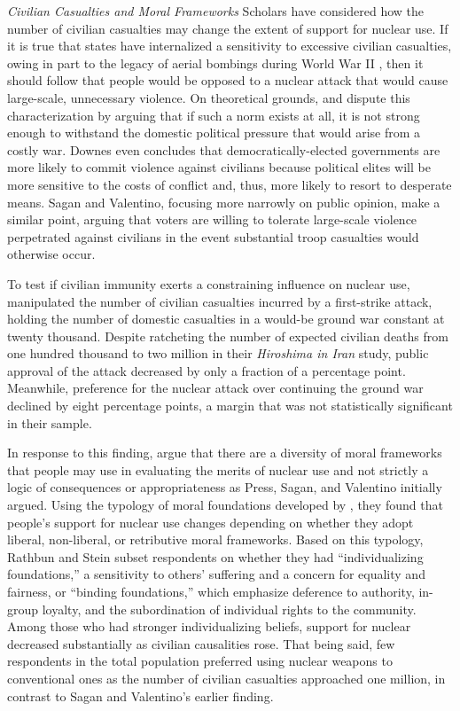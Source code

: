 \documentclass[12pt]{article}
\begin{document}
\textit{Civilian Casualties and Moral Frameworks}
\noindent
Scholars have considered how the number of civilian casualties may change the extent of support for nuclear use. If it is true that states have internalized a sensitivity to excessive civilian casualties, owing in part to the legacy of aerial bombings during World War II \citep{pinker_better_2011, thomas_ethics_2014}, then it should follow that people would be opposed to a nuclear attack that would cause large-scale, unnecessary violence. On theoretical grounds, \citet{downes_desperate_2006} and \citet{sagan_revisiting_2017} dispute this characterization by arguing that if such a norm exists at all, it is not strong enough to withstand the domestic political pressure that would arise from a costly war. Downes even concludes that democratically-elected governments are more likely to commit violence against civilians because political elites will be more sensitive to the costs of conflict and, thus, more likely to resort to desperate means. Sagan and Valentino, focusing more narrowly on public opinion, make a similar point, arguing that voters are willing to tolerate large-scale violence perpetrated against civilians in the event substantial troop casualties would otherwise occur.

To test if civilian immunity exerts a constraining influence on nuclear use, \citet{sagan_revisiting_2017} manipulated the number of civilian casualties incurred by a first-strike attack, holding the number of domestic casualties in a would-be ground war constant at twenty thousand. Despite ratcheting the number of expected civilian deaths from one hundred thousand to two million in their \textit{Hiroshima in Iran} study, public approval of the attack decreased by only a fraction of a percentage point. Meanwhile, preference for the nuclear attack over continuing the ground war declined by eight percentage points, a margin that was not statistically significant in their sample.

In response to this finding, \citet{rathbun_greater_2019} argue that there are a diversity of moral frameworks that people may use in evaluating the merits of nuclear use and not strictly a logic of consequences or appropriateness as Press, Sagan, and Valentino initially argued. Using the typology of moral foundations developed by \citet{graham_mapping_2011}, they found that people's support for nuclear use changes depending on whether they adopt liberal, non-liberal, or retributive moral frameworks. Based on this typology, Rathbun and Stein subset  respondents on whether they had “individualizing foundations,” a sensitivity to others' suffering and a concern for equality and fairness, or “binding foundations,” which emphasize deference to authority, in-group loyalty, and the subordination of individual rights to the community. Among those who had stronger individualizing beliefs, support for nuclear decreased substantially as civilian causalities rose. That being said, few respondents in the total population preferred using nuclear weapons to conventional ones as the number of civilian casualties approached one million, in contrast to Sagan and Valentino's earlier finding.
\end{document}
